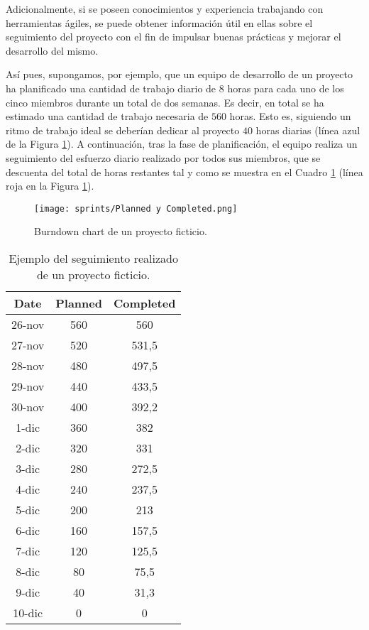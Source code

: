 Adicionalmente, si se poseen conocimientos y experiencia trabajando con herramientas ágiles, se puede obtener información útil en ellas sobre el seguimiento del proyecto con el fin de impulsar buenas prácticas y mejorar el desarrollo del mismo.

Así pues, supongamos, por ejemplo, que un equipo de desarrollo de un proyecto ha planificado una cantidad de trabajo diario de $8$ horas para cada uno de los cinco miembros durante un total de dos semanas. Es decir, en total se ha estimado una cantidad de trabajo necesaria de $560$ horas. Esto es, siguiendo un ritmo de trabajo ideal se deberían dedicar al proyecto $40$ horas diarias (línea azul de la Figura \ref{fig:examplescrum}). A continuación, tras la fase de planificación, el equipo realiza un seguimiento del esfuerzo diario realizado por todos sus miembros, que se descuenta del total de horas restantes tal y como se muestra en el Cuadro \ref{tab:examplescrum} (línea roja en la Figura \ref{fig:examplescrum}).

\begin{figure}[H]
    \centering
    \texttt{[image: sprints/Planned y Completed.png]}
    \caption{Burndown chart de un proyecto ficticio.}
    \label{fig:examplescrum}
\end{figure}

\begin{table}[H]
\centering
\caption{Ejemplo del seguimiento realizado de un proyecto ficticio.}
\label{tab:examplescrum}
\begin{tabular}{ccc}
\hline
\textbf{Date} & \textbf{Planned} & \textbf{Completed} \\ \hline
26-nov & 560 & 560 \\
27-nov & 520 & 531,5 \\
28-nov & 480 & 497,5 \\
29-nov & 440 & 433,5 \\
30-nov & 400 & 392,2 \\
1-dic & 360 & 382 \\
2-dic & 320 & 331 \\
3-dic & 280 & 272,5 \\
4-dic & 240 & 237,5 \\
5-dic & 200 & 213 \\
6-dic & 160 & 157,5 \\
7-dic & 120 & 125,5 \\
8-dic & 80 & 75,5 \\
9-dic & 40 & 31,3 \\
10-dic & 0 & 0 \\ \hline
\end{tabular}
\end{table}

